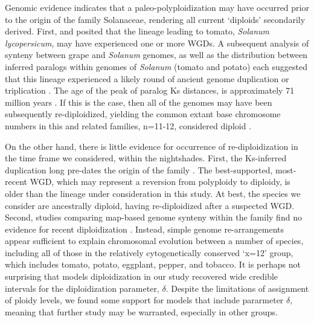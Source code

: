 Genomic evidence indicates that a paleo-polyploidization may have occurred prior to the origin of the family Solanaceae, rendering all current `diploids' secondarily derived. 
First, \citet{ku2000} and \citet{blanc2004} posited that the lineage leading to tomato, \textit{Solanum lycopersicum}, may have experienced one or more WGDs.
A subsequent analysis of synteny between grape and \textit{Solanum} genomes, as well as the distribution between inferred paralogs within genomes of \textit{Solanum} (tomato and potato) each suggested that this lineage experienced a likely round of ancient genome duplication or triplication \citep{tomato2012}. 
The age of the peak of paralog Ks distances, is approximately 71 million years \citep{tomato2012}. 
If this is the case, then all of the genomes may have been subsequently re-diploidized, yielding the common extant base chromosome numbers in this and related families, n=11-12, considered diploid \citep{robertson_2011}. 

On the other hand, there is little evidence for occurrence of re-diploidization in the time frame we considered, within the nightshades.
First, the Ks-inferred duplication long pre-dates the origin of the family \citep{sarkinen_2013}. 
The best-supported, most-recent WGD, which may represent a reversion from polyploidy to diploidy, is older than the lineage under consideration in this study.
At best, the species we consider are ancestrally diploid, having re-diploidized after a suspected WGD.
Second, studies comparing map-based genome synteny within the family find no evidence for recent diploidization \citep{wu_2010a}.
Instead, simple genome re-arrangements appear sufficient to explain chromosomal evolution between a number of species, including all of those in the relatively cytogenetically conserved `x=12' group, which includes tomato, potato, eggplant, pepper, and tobacco.
It is perhaps not surprising that models diploidization in our study recovered wide credible intervals for the diploidization parameter, $\delta$. 
Despite the limitations of assignment of ploidy levels, we found some support for models that include pararmeter $\delta$, meaning that further study may be warranted, especially in other groups.

%

